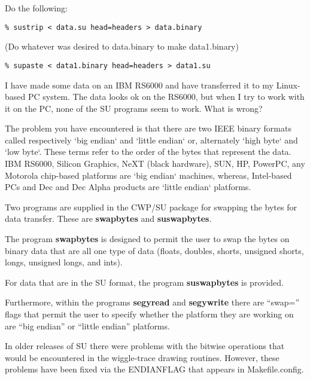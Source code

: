 {{{{{{{\begin{rmans}
Do the following:

{\small \begin{verbatim}
% sustrip < data.su head=headers > data.binary
\end{verbatim}} \noindent

(Do whatever was desired to data.binary to make data1.binary)

{\small \begin{verbatim}
% supaste < data1.binary head=headers > data1.su
\end{verbatim}} \noindent
\end{rmans}

\begin{question}
I have made some data on an IBM RS6000 and have transferred it to
my Linux-based PC system. The data looks ok on the RS6000,
but when I try to work with it on the PC, none of the SU programs seem
to work. What is wrong?
\end{question}

\begin{rmans}
The problem you have encountered is that there are two IEEE binary
formats called respectively `big endian` and `little endian` or,
alternately `high byte` and `low byte`. These terms refer to the
order of the bytes that represent the data. IBM RS6000, Silicon
Graphics, NeXT (black hardware), SUN, HP, PowerPC, any Motorola
chip-based platforms are `big endian` machines, whereas, Intel-based
PCs and Dec and Dec Alpha products are `little endian` platforms.

Two programs are supplied in the CWP/SU package for swapping
the bytes for data transfer. These are  {\bf swapbytes} and {\bf suswapbytes}.

The program {\bf swapbytes} is designed to permit the user to swap
the bytes on binary data that are all one type of data (floats, doubles,
shorts, unsigned shorts, longs, unsigned longs, and ints).

For data that are in the {\small\sf SU} format, the program {\bf suswapbytes} is
provided.

Furthermore, within the programs {\bf segyread} and {\bf segywrite}
there are ``swap='' flags that permit the user to specify whether
the platform they are working on are ``big endian'' or ``little endian''
platforms.

In older releases of {\small\sf SU} there were problems with the bitwise operations
that would be encountered in the wiggle-trace drawing routines. However,
these problems have been fixed via the ENDIANFLAG that appears in
Makefile.config.
\end{rmans}

}}}}}}}

